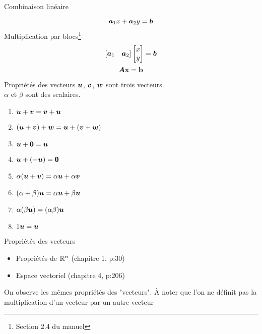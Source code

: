 \documentclass[french, handout]{beamer}
\begin{document}
\begin{frame}{Combinaison linéaire}

\[
\boldsymbol{a}_1x + \boldsymbol{a}_2y = \boldsymbol{b}
\]
\vfill
Multiplication par blocs\footnote{Section 2.4 du manuel}
\[
[\boldsymbol{a}_1 \quad \boldsymbol{a}_2] \begin{bmatrix}
x\\y
\end{bmatrix}
= \boldsymbol{b}
\]\vfill
    \[\boldsymbol{A}\textbf{x} = \textbf{b}\]

\end{frame}

\begin{frame}{Propriétés des vecteurs}
$\boldsymbol{u}$, $\boldsymbol{v}$, $\boldsymbol{w}$ sont trois vecteurs.\\
$\alpha$ et $\beta$ sont des scalaires.
\begin{enumerate}
\item $\boldsymbol{u} + \boldsymbol{v} = \boldsymbol{v} + \boldsymbol{u}$
\item $ (\boldsymbol{u} + \boldsymbol{v}) + \boldsymbol{w} = \boldsymbol{u} + (\boldsymbol{v} + \boldsymbol{w})$
\item $\boldsymbol{u} + \mbox{\textsf{\textbf{{0}}}} = \boldsymbol{u}$
\item $ \boldsymbol{u} + (-\boldsymbol{u}) = \mbox{\textsf{\textbf{{0}}}}$
\item $\alpha(\boldsymbol{u} + \boldsymbol{v}) = \alpha\boldsymbol{u} + \alpha\boldsymbol{v}$
\item $ (\alpha + \beta)\boldsymbol{u} = \alpha\boldsymbol{u} + \beta\boldsymbol{u}$
\item $\alpha(\beta\boldsymbol{u}) = (\alpha\beta)\boldsymbol{u}$
\item $1\boldsymbol{u} = \boldsymbol{u}$
\end{enumerate}
\end{frame}

\begin{frame}{Propriétés des vecteurs}
\begin{itemize}
\item Propriétés de $\mathbb{R}^n$ (chapitre 1, p:30)
\item Espace vectoriel (chapitre 4, p:206)
\end{itemize}
On observe les mêmes propriétés des "vecteurs".
\vfill À noter que l'on ne définit pas la multiplication
d'un vecteur par un autre vecteur
\end{frame}
\end{document}
